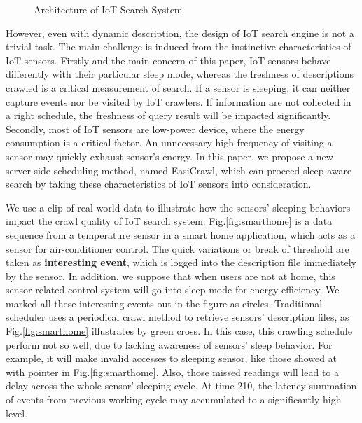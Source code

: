 \documentclass[conference]{IEEEtran}
\begin{document}
\begin{figure}
	\vspace{0.5em}
	\centering
	\hspace{-3.0em}
	
	\captionsetup{justification=centering}
	\caption{Architecture of IoT Search System}
	\vspace{-1.0em}
	\label{fig:architecture}
\end{figure}

However, even with dynamic description, the design of IoT search engine is not a trivial task. 
The main challenge is induced from the instinctive characteristics of IoT sensors. 
Firstly and the main concern of this paper, IoT sensors behave differently with their particular sleep mode, whereas the freshness of descriptions crawled is a critical measurement of search. 
If a sensor is sleeping, it can neither capture events nor be visited by IoT crawlers. 
If information are not collected in a right schedule, the freshness of query result will be impacted significantly.
Secondly, most of IoT sensors are low-power device, where the energy consumption is a critical factor. 
An unnecessary high frequency of visiting a sensor may quickly exhaust sensor's energy.
In this paper, we propose a new server-side scheduling method, named EasiCrawl, which can proceed sleep-aware search by taking these characteristics of IoT sensors into consideration.

We use a clip of real world data to illustrate how the sensors' sleeping behaviors impact the crawl quality of IoT search system.
Fig.\ref{fig:smarthome} is a data sequence from a temperature sensor in a smart home application, which acts as a sensor for air-conditioner control. 
The quick variations or break of threshold are taken as \textbf{interesting event}, which is logged into the description file immediately by the sensor.
In addition, we suppose that when users are not at home, this sensor related control system will go into sleep mode for energy efficiency.
We marked all these interesting events out in the figure as circles.
Traditional scheduler uses a periodical crawl method to retrieve sensors' description files, as Fig.\ref{fig:smarthome} illustrates by green cross.
In this case, this crawling schedule perform not so well, due to lacking awareness of sensors' sleep behavior.
For example, it will make invalid accesses to sleeping sensor, like those showed at with pointer in Fig.\ref{fig:smarthome}. 
Also, those missed readings will lead to a delay across the whole sensor' sleeping cycle. 
At time 210, the latency summation of events from previous working cycle may accumulated to a significantly high level.
\end{document}
